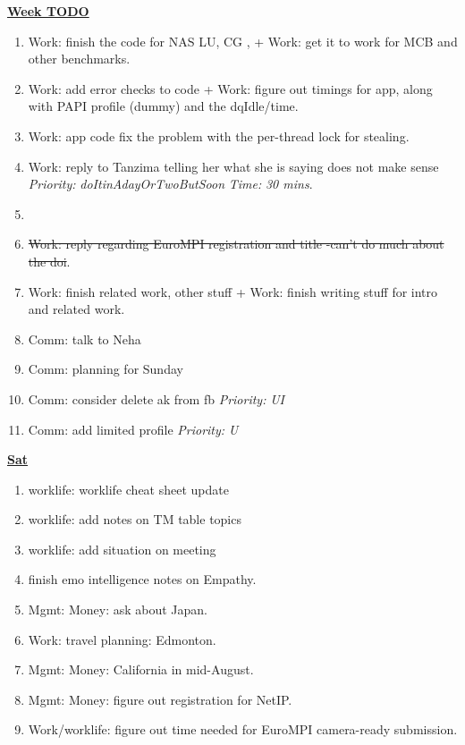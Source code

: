 \documentclass[serif,mathserif,final]{beamer}
\newcommand{\doneTask}[1]{\item \sout{#1}}
\newcommand{\timeEst}[1]{\textit{Time:} \textit{#1}}
\newcommand{\priority}[1]{\textit{Priority:} \textit{#1}}
\begin{document}
\begin{frame}{}
\begin{columns}[t]
\begin{column}{0.33\linewidth}{\textbf{\underline{Week TODO}}}
\begin{block}
\begin{enumerate}
\item \tiny Work: finish the code for NAS LU, CG , + Work: get it to work for MCB and other benchmarks. 

\item \tiny Work: add error checks to code + Work: figure out timings for app, along with PAPI profile (dummy) and the dqIdle/time. 

\item \tiny Work: app code fix the problem with the per-thread lock for stealing. 

\item \tiny Work: reply to Tanzima telling her what she is saying does not make sense \priority{doItinAdayOrTwoButSoon} \timeEst{30 mins}.

\item \tiny \doneTask{Work: reply regarding EuroMPI registration and title -can't do much about the doi}. 

\item \tiny Work: finish related work, other stuff + Work: finish 
  writing stuff for intro and related work. 

\item \tiny Comm: talk to Neha 


\item \tiny Comm: planning for Sunday

\item \tiny Comm: consider delete ak from fb \priority{UI}  
\item \tiny Comm: add limited profile \priority{U} 
\end{enumerate} 

\textbf{\underline{Sat}} 
\begin{enumerate} 

\item \tiny worklife: worklife cheat sheet update 
\item \tiny worklife: add notes on TM table topics 
\item \tiny worklife: add situation on meeting

\item \tiny finish emo intelligence notes on Empathy. 


\item \tiny Mgmt: Money: ask about Japan. 
\item \tiny Work: travel planning: Edmonton. 
\item \tiny Mgmt: Money: California in mid-August. 
\item \tiny Mgmt: Money: figure out registration for NetIP. 
\item \tiny Work/worklife: figure out time needed for EuroMPI camera-ready submission. 



\end{enumerate}
\end{block}
\end{column}
\end{columns}
\end{frame}
\end{document}
